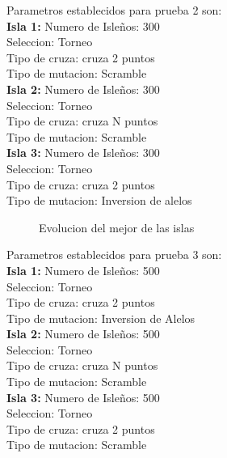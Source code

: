 \documentclass[10pt,letterpaper]{article}
\begin{document}
Parametros establecidos para prueba 2 son:
\\
\textbf{Isla 1:} Numero de Isleños: 300\\
Seleccion: Torneo\\ 
Tipo de cruza: cruza 2 puntos\\
Tipo de mutacion: Scramble\\
\textbf{Isla 2:} Numero de Isleños: 300\\
Seleccion: Torneo\\ 
Tipo de cruza: cruza N puntos\\
Tipo de mutacion: Scramble\\
\textbf{Isla 3:} Numero de Isleños: 300\\
Seleccion: Torneo\\ 
Tipo de cruza: cruza 2 puntos\\
Tipo de mutacion: Inversion de alelos

\begin{figure}[H]
      \begin{center}
        \caption{Evolucion del mejor de las islas}
        \label{Patron de señales para reconocimiento de señal Gaussiana}
      \end{center}
    \end{figure}

Parametros establecidos para prueba 3 son:
\\
\textbf{Isla 1:} Numero de Isleños: 500\\
Seleccion: Torneo\\ 
Tipo de cruza: cruza 2 puntos\\
Tipo de mutacion: Inversion de Alelos\\
\textbf{Isla 2:} Numero de Isleños: 500\\
Seleccion: Torneo\\ 
Tipo de cruza: cruza N puntos\\
Tipo de mutacion: Scramble\\
\textbf{Isla 3:} Numero de Isleños: 500\\
Seleccion: Torneo\\ 
Tipo de cruza: cruza 2 puntos\\
Tipo de mutacion: Scramble
\end{document}
